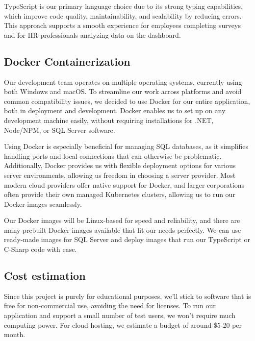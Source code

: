 \documentclass[conference]{IEEEtran}
\begin{document}
TypeScript is our primary language choice due to its strong typing 
capabilities, which improve code quality, maintainability, 
and scalability by reducing errors. This approach supports 
a smooth experience for employees completing surveys and 
for HR professionals analyzing data on the dashboard.
\newline

    \subsection {Docker Containerization}

    Our development team operates on multiple operating systems, 
    currently using both Windows and macOS. To streamline our 
    work across platforms and avoid common compatibility issues, 
    we decided to use Docker for our entire application, both in 
    deployment and development. Docker enables us to set up on 
    any development machine easily, without requiring installations 
    for .NET, Node/NPM, or SQL Server software. \newline
    
    Using Docker is especially beneficial for managing SQL databases, as it simplifies 
    handling ports and local connections that can otherwise be 
    problematic. Additionally, Docker provides us with flexible 
    deployment options for various server environments, allowing 
    us freedom in choosing a server provider. Most modern cloud 
    providers offer native support for Docker, and larger corporations 
    often provide their own managed Kubernetes clusters, allowing 
    us to run our Docker images seamlessly.\newline

    Our Docker images will be Linux-based for speed and reliability, 
    and there are many prebuilt Docker images available that fit our 
    needs perfectly. We can use ready-made images for SQL Server and 
    deploy images that run our TypeScript or C-Sharp code with ease.
    \newline

    \subsection {Cost estimation}
    Since this project is purely for educational purposes, we’ll stick 
    to software that is free for non-commercial use, avoiding the need 
    for licenses. To run our application and support a small number of 
    test users, we won’t require much computing power. For cloud hosting, 
    we estimate a budget of around \$5-20 per month.
    \newline
\end{document}
